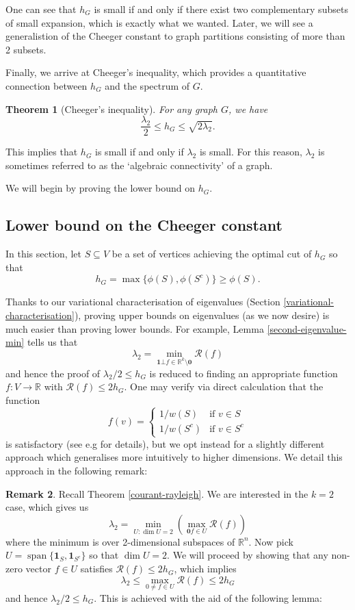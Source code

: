 \documentclass[a4paper,11pt]{article}
\newtheorem{theorem}{Theorem}[section]
\theoremstyle{definition}
\newtheorem{remark}[theorem]{Remark}
\newcommand{\R}{\mathbb{R}}
\newcommand{\rayleigh}[1]{\mathcal{R}\left(#1\right)}
\DeclareMathOperator{\spn}{span}
\begin{document}
One can see that $h_G$ is small if and only if there exist two complementary subsets of small expansion, which is exactly what we wanted. Later, we will see a generalistion of the Cheeger constant to graph partitions consisting of more than 2 subsets.

Finally, we arrive at Cheeger's inequality, which provides a quantitative connection between $h_G$ and the spectrum of $G$.
\begin{theorem}[Cheeger's inequality]\label{fo-cheeger}
For any graph $G$, we have \[
\frac{\lambda_2}{2} \le h_G \le \sqrt{2\lambda_2}.
\]
\end{theorem}

This implies that $h_G$ is small if and only if $\lambda_2$ is small. For this reason, $\lambda_2$ is sometimes referred to as the `algebraic connectivity' of a graph.

We will begin by proving the lower bound on $h_G$.

\subsection{Lower bound on the Cheeger constant}\label{cheeger-lower-bound-section}

In this section, let $S \subseteq V$ be a set of vertices achieving the optimal cut of $h_G$ so that
\[
h_G = \max \{\phi(S), \phi(S^c)\} \ge \phi(S).
\]

Thanks to our variational characterisation of eigenvalues (Section \ref{variational-characterisation}), proving upper bounds on eigenvalues (as we now desire) is much easier than proving lower bounds. For example, Lemma \ref{second-eigenvalue-min} tells us that
\[
\lambda_2 = \min_{\bm{1} \bot f \in \R^k \setminus{\bm{0}}} \rayleigh{f}
\]
and hence the proof of $\lambda_2/2 \le h_G$ is reduced to finding an appropriate function $f: V \to \R$ with $\rayleigh{f} \le 2h_G$. One may verify via direct calculation that the function
\[
f(v) = \begin{cases} 1/w(S) &\text{if } v \in S \\ 1/w(S^c) &\text{if } v \in S^c \end{cases}
\] is satisfactory (see e.g \cite{book} for details), but we opt instead for a slightly different approach which generalises more intuitively to higher dimensions. We detail this approach in the following remark:

\begin{remark}\label{remark-cheeger-lower}
Recall Theorem \ref{courant-rayleigh}. We are interested in the $k = 2$ case, which gives us
\[
\lambda_2 = \min_{U : \dim{U} = 2} \left( \max_{\bm{0} f \in U} \rayleigh{f} \right)
\]
where the minimum is over 2-dimensional subspaces of $\R^n$. Now pick $U = \spn\{\bm{1}_S, \bm{1}_{S^c}\}$ so that $\dim{U} = 2$. We will proceed by showing that any non-zero vector $f \in U$ satisfies $\rayleigh{f} \le 2 h_G$, which implies
\[
\lambda_2 \le \max_{0 \ne f \in U} \rayleigh{f} \le 2 h_G
\] and hence $\lambda_2/2 \le h_G$. This is achieved with the aid of the following lemma:
\end{remark}
\end{document}
